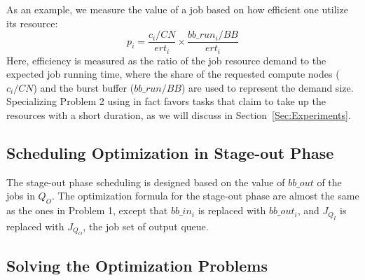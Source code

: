 As an example, we measure the value of a job based on how efficient one utilize its resource:
\begin{equation}
        p_i = \frac{c_i / CN}{ert_i} \times \frac{bb\_run_i / BB}{ert_i}
        \label{Equ:DefValue}
\end{equation}
Here, efficiency is measured as the ratio of the job resource demand to the expected job running time,
where the share of the requested compute nodes ($c_i/CN$) and the burst buffer ($bb\_run/BB$) are used to
represent the demand size.
Specializing Problem 2 using  in fact favors tasks that claim to take up the resources with a short duration, as we will discuss in Section~\ref{Sec:Experiments}.

\subsection{Scheduling Optimization in Stage-out Phase}

The stage-out phase scheduling is designed based on the value of $bb\_out$ of the jobs in $Q_O$.
The optimization formula for the stage-out phase are almost the same as the ones in Problem 1, except that $bb\_in_i$ is replaced with $bb\_out_i$, and
$J_{Q_I}$ is replaced with $J_{Q_O}$, the job set of output queue.


\subsection{Solving the Optimization Problems}

